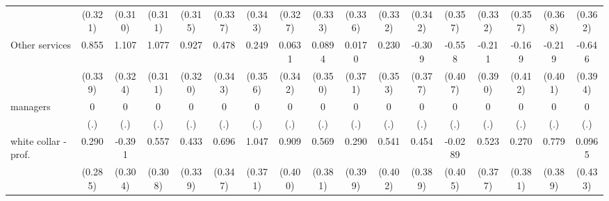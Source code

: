 {\begin{tabular}{l*{16}{c}}
                    &     (0.321)         &     (0.310)         &     (0.311)         &     (0.315)         &     (0.337)         &     (0.343)         &     (0.327)         &     (0.333)         &     (0.336)         &     (0.332)         &     (0.342)         &     (0.357)         &     (0.332)         &     (0.357)         &     (0.368)         &     (0.362)         \\
[1em]
Other services      &       0.855\sym{*}  &       1.107\sym{***}&       1.077\sym{***}&       0.927\sym{**} &       0.478         &       0.249         &      0.0631         &      0.0894         &      0.0170         &       0.230         &      -0.309         &      -0.558         &      -0.211         &      -0.169         &      -0.219         &      -0.646         \\
                    &     (0.339)         &     (0.324)         &     (0.311)         &     (0.320)         &     (0.343)         &     (0.356)         &     (0.342)         &     (0.350)         &     (0.371)         &     (0.353)         &     (0.377)         &     (0.407)         &     (0.390)         &     (0.412)         &     (0.401)         &     (0.394)         \\
[1em]
managers            &           0         &           0         &           0         &           0         &           0         &           0         &           0         &           0         &           0         &           0         &           0         &           0         &           0         &           0         &           0         &           0         \\
                    &         (.)         &         (.)         &         (.)         &         (.)         &         (.)         &         (.)         &         (.)         &         (.)         &         (.)         &         (.)         &         (.)         &         (.)         &         (.)         &         (.)         &         (.)         &         (.)         \\
[1em]
white collar - prof.&       0.290         &      -0.391         &       0.557         &       0.433         &       0.696\sym{*}  &       1.047\sym{**} &       0.909\sym{*}  &       0.569         &       0.290         &       0.541         &       0.454         &     -0.0289         &       0.523         &       0.270         &       0.779\sym{*}  &      0.0965         \\
                    &     (0.285)         &     (0.304)         &     (0.308)         &     (0.339)         &     (0.347)         &     (0.371)         &     (0.400)         &     (0.381)         &     (0.399)         &     (0.402)         &     (0.389)         &     (0.405)         &     (0.377)         &     (0.381)         &     (0.389)         &     (0.433)         \\

\end{tabular}}
